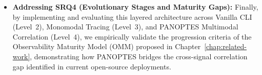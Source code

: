 \begin{itemize}
    \item \textbf{Addressing SRQ4 (Evolutionary Stages and Maturity Gaps):} Finally, by implementing and evaluating this layered architecture across Vanilla CLI (Level~2), Monomodal Tracing (Level~3), and PANOPTES Multimodal Correlation (Level~4), we empirically validate the progression criteria of the Observability Maturity Model (OMM) proposed in Chapter~\ref{chap:related-work}, demonstrating how PANOPTES bridges the cross-signal correlation gap identified in current open-source deployments.
\end{itemize}
